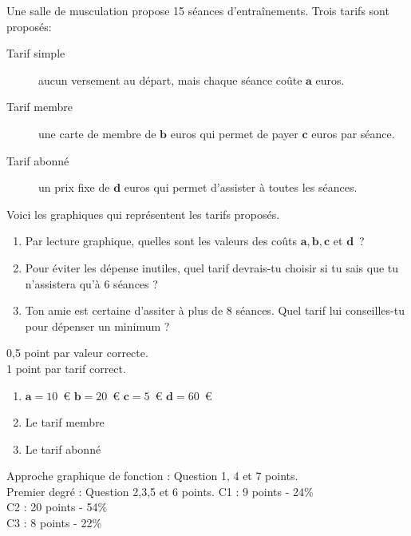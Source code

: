\documentclass[a4paper, 12pt, parskip=half-]{scrartcl}
\begin{document}
\newpage
\begin{exercise}[points=4]
    Une salle de musculation propose 15 séances d'entraînements.
    Trois tarifs sont proposés:
    \begin{description}
        \item[Tarif simple] aucun versement au départ, mais chaque séance coûte $\bm{a}$ euros.
        \item[Tarif membre] une carte de membre de $\bm{b}$ euros qui permet de payer $\bm{c}$ euros par séance.
        \item[Tarif abonné] un prix fixe de $\bm{d}$ euros qui permet d'assister à toutes les séances.
    \end{description}
    Voici les graphiques qui représentent les tarifs proposés.
    \begin{center}
        
    \end{center}
    \begin{enumerate}
        \item Par lecture graphique, quelles sont les valeurs des coûts $\bm{a}, \bm{b}, \bm{c}$ et $\bm{d}$~?
        \item Pour éviter les dépense inutiles, quel tarif devrais-tu choisir si tu sais que tu n'assistera qu'à 6 séances ?
        \item Ton amie est certaine d'assiter à plus de 8 séances. Quel tarif lui conseilles-tu pour dépenser un minimum ?
    \end{enumerate}
\end{exercise}
\begin{solution}
    0,5 point par valeur correcte.\\
    1 point par tarif correct.
    \begin{enumerate}
        \item $\bm{a} = 10$~€\hfill
              $\bm{b} = 20$~€\hfill
              $\bm{c} = 5$~€\hfill
              $\bm{d} = 60$~€
        \item Le tarif membre
        \item Le tarif abonné
    \end{enumerate}
\end{solution}
\newpage
\printsolutions
\bigbreak
{}
Approche graphique de fonction : Question 1, 4 et 7  points.\\
Premier degré : Question 2,3,5 et 6  points.
C1 : 9 points - 24\%\\
C2 : 20 points - 54\%\\
C3 : 8 points - 22\%
\end{document}
